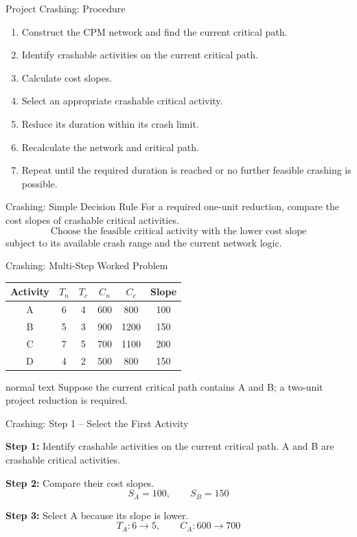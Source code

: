 \documentclass[aspectratio=169,10pt]{beamer}
\begin{document}
\begin{frame}{Project Crashing: Procedure}
\begin{enumerate}
  \item Construct the CPM network and find the current critical path.
  \item Identify crashable activities on the current critical path.
  \item Calculate cost slopes.
  \item Select an appropriate crashable critical activity.
  \item Reduce its duration within its crash limit.
  \item Recalculate the network and critical path.
  \item Repeat until the required duration is reached or no further feasible crashing is possible.
\end{enumerate}
\end{frame}

\begin{frame}{Crashing: Simple Decision Rule}
For a required one-unit reduction, compare the cost slopes of crashable critical activities.
\[
\boxed{\text{Choose the feasible critical activity with the lower cost slope}}
\]
subject to its available crash range and the current network logic.
\end{frame}

\begin{frame}{Crashing: Multi-Step Worked Problem}
\centering\small
\begin{tabular}{c|cccc|c}
\toprule Activity & $T_n$ & $T_c$ & $C_n$ & $C_c$ & Slope\\
\midrule
A&6&4&600&800&100\\
B&5&3&900&1200&150\\
C&7&5&700&1100&200\\
D&4&2&500&800&150\\
\bottomrule
\end{tabular}
\vfill
\begin{beamercolorbox}[wd=0.90\textwidth,sep=0.16cm,center]{normal text}
\small Suppose the current critical path contains A and B; a two-unit project reduction is required.
\end{beamercolorbox}
\end{frame}

\begin{frame}{Crashing: Step 1 -- Select the First Activity}
\small
\par\textbf{Step 1:} Identify crashable activities on the current critical path.
A and B are crashable critical activities.
\pause
\par\textbf{Step 2:} Compare their cost slopes.
\[
S_A=100,\qquad S_B=150
\]
\pause
\par\textbf{Step 3:} Select A because its slope is lower.
\[
T_A:6\rightarrow5,\qquad C_A:600\rightarrow700
\]
\end{frame}
\end{document}
